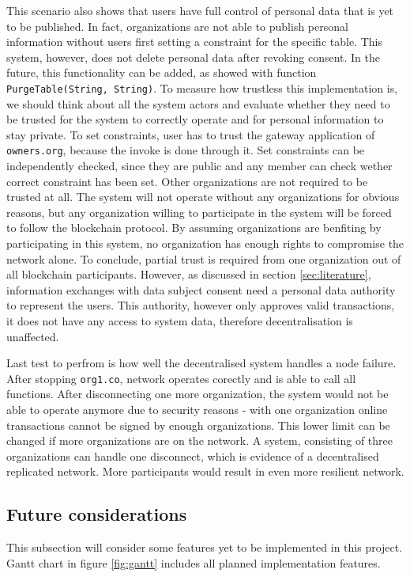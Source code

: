 \documentclass[12pt]{article}
\begin{document}
    This scenario also shows that users have full control of personal data that is yet to be published. In fact, organizations are not able to publish personal information without users first setting a constraint for the specific table. This system, however, does not delete personal data after revoking consent. In the future, this functionality can be added, as showed with function \lstinline{PurgeTable(String, String)}. To measure how trustless this implementation is, we should think about all the system actors and evaluate whether they need to be trusted for the system to correctly operate and for personal information to stay private. To set constraints, user has to trust the gateway application of \lstinline{owners.org}, because the invoke is done through it. Set constraints can be independently checked, since they are public and any member can check wether correct constraint has been set. Other organizations are not required to be trusted at all. The system will not operate without any organizations for obvious reasons, but any organization willing to participate in the system will be forced to follow the blockchain protocol. By assuming organizations are benfiting by participating in this system, no organization has enough rights to compromise the network alone. To conclude, partial trust is required from one organization out of all blockchain participants. However, as discussed in section \ref{sec:literature}, information exchanges with data subject consent need a personal data authority to represent the users. This authority, however only approves valid transactions, it does not have any access to system data, therefore decentralisation is unaffected.

    Last test to perfrom is how well the decentralised system handles a node failure. After stopping \lstinline{org1.co}, network operates corectly and is able to call all functions. After disconnecting one more organization, the system would not be able to operate anymore due to security reasons - with one organization online transactions cannot be signed by enough organizations. This lower limit can be changed if more organizations are on the network. A system, consisting of three organizations can handle one disconnect, which is evidence of a decentralised replicated network. More participants would result in even more resilient network.

    \subsection{Future considerations}
    \label{subsec:future}
    This subsection will consider some features yet to be implemented in this project. Gantt chart in figure \ref{fig:gantt} includes all planned implementation features.
    
\end{document}
